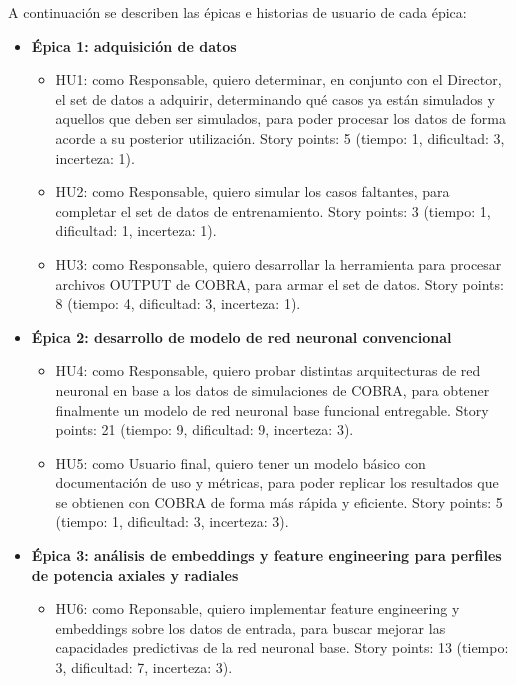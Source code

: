 \documentclass[
11pt, %
]{charter}
\begin{document}
A continuación se describen las épicas e historias de usuario de cada épica:

\begin{itemize}
  \item \textbf{Épica 1: adquisición de datos}
    \begin{itemize}
      \item HU1: como Responsable, quiero determinar, en conjunto con el Director, el set de datos a adquirir, determinando qué casos ya están simulados y aquellos que deben ser simulados, para poder procesar los datos de forma acorde a su posterior utilización. Story points: 5 (tiempo: 1, dificultad: 3, incerteza: 1).
      \item HU2: como Responsable, quiero simular los casos faltantes, para completar el set de datos de entrenamiento. Story points: 3 (tiempo: 1, dificultad: 1, incerteza: 1).
      \item HU3: como Responsable, quiero desarrollar la herramienta para procesar archivos OUTPUT de COBRA, para armar el set de datos. Story points: 8 (tiempo: 4, dificultad: 3, incerteza: 1).
    \end{itemize}
  \item \textbf{Épica 2: desarrollo de modelo de red neuronal convencional}
    \begin{itemize}
      \item HU4: como Responsable, quiero probar distintas arquitecturas de red neuronal en base a los datos de simulaciones de COBRA, para obtener finalmente un modelo de red neuronal base funcional entregable. Story points: 21 (tiempo: 9, dificultad: 9, incerteza: 3).
      \item HU5: como Usuario final, quiero tener un modelo básico con documentación de uso y métricas, para poder replicar los resultados que se obtienen con COBRA de forma más rápida y eficiente. Story points: 5 (tiempo: 1, dificultad: 3, incerteza: 3).
    \end{itemize}
  \item \textbf{Épica 3: análisis de embeddings y feature engineering para perfiles de potencia axiales y radiales}
    \begin{itemize}
      \item HU6: como Reponsable, quiero implementar feature engineering y embeddings sobre los datos de entrada, para buscar mejorar las capacidades predictivas de la red neuronal base. Story points: 13 (tiempo: 3, dificultad: 7, incerteza: 3).

\end{itemize}
\end{itemize}
\end{document}
